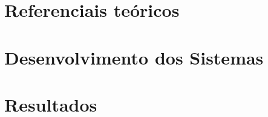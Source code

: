 \documentclass[
	12pt,				%
	openright,			%
	oneside,
	a4paper,			%
	english,			%
	french,				%
	spanish,			%
	brazil				%
	]{abntex2}
\begin{document}

\textual



\part{Referenciais teóricos}





\part{Desenvolvimento dos Sistemas}







\part{Resultados}








\postextual
\end{document}
